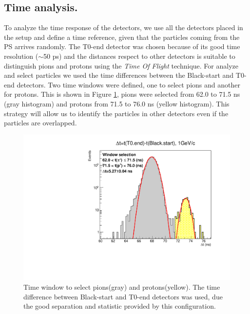	\subsection{Time analysis.}\label{section:TimeMeasurement}
	
	To analyze the time response of the detectors, we use all the detectors placed in the setup and 
	define a time reference, given that the particles coming from the PS arrives randomly. %
	The T0-end detector was chosen because of its good time resolution ($\sim$50 ps)\cite{T0detector} and the 
	distances respect to other detectors is suitable to distinguish pions and protons using the \textit{Time Of 
	Flight} technique.
	For analyze and select particles we used the time differences between the Black-start and T0-end detectors.
	Two time windows were defined, one to select pions and another for protons. %
	This is shown in Figure \ref{figure:ParSel_1GeV}, pions were selected from 62.0 to 71.5 ns (gray
	histogram) and protons from 71.5 to 76.0 ns (yellow histogram). 
	This strategy will allow us to identify the particles in other detectors even if the particles are overlapped.
	
	\begin{figure}[h!]
	  \begin{center}
		\includegraphics[scale=0.50]{./images/time/1GeV/NotepPiSelH1.pdf}%
		\caption{Time window to select pions(gray) and protons(yellow). The time difference between Black-start and T0-end detectors
		was used, due the good separation and statistic provided by this configuration.}
		\label{figure:ParSel_1GeV}
	  \end{center}
	\end{figure}
	
